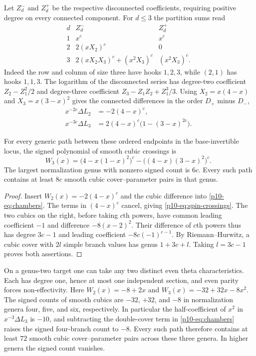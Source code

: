 Let $Z_d^-$ and $Z_d^+$ be the respective disconnected coefficients,
requiring positive degree on every connected component. For $d\le3$
the partition sums read
\[
\begin{array}{c|cc}
 d & Z_d^- & Z_d^+ \\ \hline
 1 & x^c & x^c \\
 2 & 2(xX_2)^c & 0 \\
 3 & 2(xX_2X_3)^c+(x^2X_3)^c & (x^2X_3)^c .
\end{array}
\]
Indeed the row and column of size three have hooks $1,2,3$, while
$(2,1)$ has hooks $1,1,3$. The logarithm of the disconnected series
has degree-two coefficient $Z_2-Z_1^2/2$ and degree-three coefficient
$Z_3-Z_1Z_2+Z_1^3/3$. Using $X_2=x(4-x)$ and $X_3=x(3-x)^2$ gives
the connected differences in the order $D_+$ minus $D_-$,
\begin{align*}
       x^{-2c}\Delta L_2 &=-2(4-x)^c,\\
       x^{-3c}\Delta L_3 &=2(4-x)^c\bigl(1-(3-x)^{2c}\bigr).
\end{align*}

\begin{corollary}\label{p10-cor:spin-counts}
For every generic path between these ordered endpoints in the
base-invertible locus, the signed polynomial of smooth cubic crossings is
\begin{equation}\label{p10-eq:spin-crossings}
       W_3(x)=\bigl(4-x(1-x)^2\bigr)^c
                         -\bigl((4-x)(3-x)^2\bigr)^c .
\end{equation}
The largest normalization genus with nonzero signed count is $6c$.
Every such path contains at least $8c$ smooth cubic cover--parameter
pairs in that genus.
\end{corollary}

\begin{proof}
Insert $W_2(x)=-2(4-x)^c$ and the cubic difference into
\eqref{p10-eq:chambers}. The terms in $(4-x)^c$ cancel, giving
\eqref{p10-eq:spin-crossings}. The two cubics on the right, before taking
$c$th powers, have common leading coefficient $-1$ and difference
$-8(x-2)^2$. Their difference of $c$th powers thus has degree $3c-1$
and leading coefficient $-8c(-1)^{c-1}$. By Riemann--Hurwitz, a
cubic cover with $2l$ simple branch values has genus $1+3c+l$.
Taking $l=3c-1$ proves both assertions.
\end{proof}

On a genus-two target one can take any two distinct even theta
characteristics. Each has degree one, hence at most one independent
section, and even parity forces non-effectivity. Here
$W_2(x)=-8+2x$ and $W_3(x)=-32+32x-8x^2$. The signed counts of smooth
cubics are $-32$, $+32$, and $-8$ in normalization genera four, five,
and six, respectively. In particular the half-coefficient of $x^2$ in
$x^{-3}\Delta L_3$ is $-10$, and subtracting the double-cover term in
\eqref{p10-eq:chambers} raises the signed four-branch count to $-8$.
Every such path therefore contains at least $72$ smooth cubic
cover--parameter pairs across these three genera. In higher genera
the signed count vanishes.
